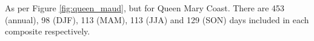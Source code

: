 \label{fig:queen_mary}
As per Figure \ref{fig:queen_maud}, but for Queen Mary Coast. There are 453 (annual), 98 (DJF), 113 (MAM), 113 (JJA) and 129 (SON) days included in each composite respectively.